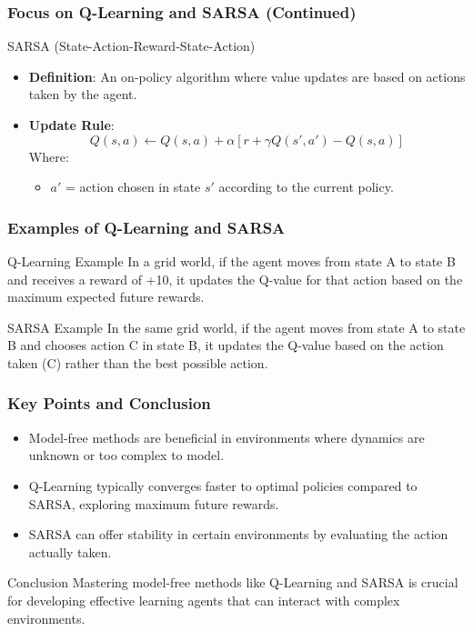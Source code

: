 \documentclass{beamer}
\begin{document}
\begin{frame}[fragile]
    \frametitle{Focus on Q-Learning and SARSA (Continued)}
    \begin{block}{SARSA (State-Action-Reward-State-Action)}
        \begin{itemize}
            \item \textbf{Definition}: An on-policy algorithm where value updates are based on actions taken by the agent.
            \item \textbf{Update Rule}:
            \begin{equation}
            Q(s, a) \leftarrow Q(s, a) + \alpha \left[ r + \gamma Q(s', a') - Q(s, a) \right]
            \end{equation}
            Where:
            \begin{itemize}
                \item $a'$ = action chosen in state $s'$ according to the current policy.
            \end{itemize}
        \end{itemize}
    \end{block}
\end{frame}

\begin{frame}[fragile]
    \frametitle{Examples of Q-Learning and SARSA}
    \begin{block}{Q-Learning Example}
        In a grid world, if the agent moves from state A to state B and receives a reward of +10, it updates the Q-value for that action based on the maximum expected future rewards.
    \end{block}
    
    \begin{block}{SARSA Example}
        In the same grid world, if the agent moves from state A to state B and chooses action C in state B, it updates the Q-value based on the action taken (C) rather than the best possible action. 
    \end{block}
\end{frame}

\begin{frame}[fragile]
    \frametitle{Key Points and Conclusion}
    \begin{itemize}
        \item Model-free methods are beneficial in environments where dynamics are unknown or too complex to model.
        \item Q-Learning typically converges faster to optimal policies compared to SARSA, exploring maximum future rewards.
        \item SARSA can offer stability in certain environments by evaluating the action actually taken.
    \end{itemize}
    \begin{block}{Conclusion}
        Mastering model-free methods like Q-Learning and SARSA is crucial for developing effective learning agents that can interact with complex environments.
    \end{block}
\end{frame}
\end{document}
